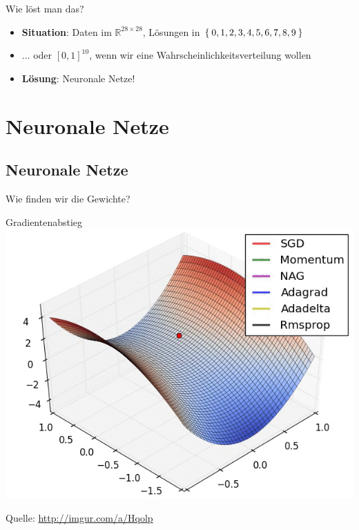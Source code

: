 \documentclass{beamer}
\begin{document}
\begin{frame}{Wie löst man das?}
    \begin{itemize}[<+->]
        \item \textbf{Situation}: Daten im $\mathbb{R}^{28 \times 28}$,
              Lösungen in $\Set{0, 1, 2, 3, 4, 5, 6, 7, 8, 9}$
        \item ... oder $[0, 1]^{10}$, wenn wir eine Wahrscheinlichkeitsverteilung wollen
        \item \textbf{Lösung}: Neuronale Netze!
    \end{itemize}
\end{frame}

\section{Neuronale Netze}
\subsection{Neuronale Netze}

\begin{frame}{}
    \begin{center}
        \Huge Wie finden wir die Gewichte?


    \end{center}
\end{frame}


\begin{frame}{Gradientenabstieg}
    \includegraphics[width=\textwidth, height=0.8\textheight, keepaspectratio]{../images/visualizing-optimization-algos-0.png}

    Quelle: \href{http://imgur.com/a/Hqolp}{http://imgur.com/a/Hqolp}
\end{frame}
\end{document}
